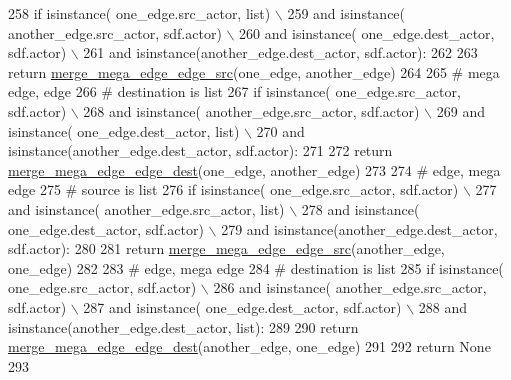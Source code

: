 \begin{DoxyCode}
258       \textcolor{keywordflow}{if}  isinstance( one\_edge.src\_actor, list) \(\backslash\)
259               \textcolor{keywordflow}{and} isinstance( another\_edge.src\_actor, sdf.actor) \(\backslash\)
260               \textcolor{keywordflow}{and} isinstance( one\_edge.dest\_actor, sdf.actor) \(\backslash\)
261               \textcolor{keywordflow}{and} isinstance(another\_edge.dest\_actor, sdf.actor):
262 
263         \textcolor{keywordflow}{return} \hyperlink{namespacesylva_1_1glic_1_1glic_adaac876d9630352fd0f5e4e3350d5b30}{merge\_mega\_edge\_edge\_src}(one\_edge, another\_edge)
264 
265       \textcolor{comment}{# mega edge, edge}
266       \textcolor{comment}{# destination is list}
267       \textcolor{keywordflow}{if}  isinstance( one\_edge.src\_actor, sdf.actor) \(\backslash\)
268               \textcolor{keywordflow}{and} isinstance( another\_edge.src\_actor, sdf.actor) \(\backslash\)
269               \textcolor{keywordflow}{and} isinstance( one\_edge.dest\_actor, list) \(\backslash\)
270               \textcolor{keywordflow}{and} isinstance(another\_edge.dest\_actor, sdf.actor):
271 
272         \textcolor{keywordflow}{return} \hyperlink{namespacesylva_1_1glic_1_1glic_aaa193270639d512daa1cf9fc2f952fdb}{merge\_mega\_edge\_edge\_dest}(one\_edge, another\_edge)
273 
274       \textcolor{comment}{# edge, mega edge}
275       \textcolor{comment}{# source is list}
276       \textcolor{keywordflow}{if}  isinstance( one\_edge.src\_actor, sdf.actor) \(\backslash\)
277               \textcolor{keywordflow}{and} isinstance( another\_edge.src\_actor, list) \(\backslash\)
278               \textcolor{keywordflow}{and} isinstance( one\_edge.dest\_actor, sdf.actor) \(\backslash\)
279               \textcolor{keywordflow}{and} isinstance(another\_edge.dest\_actor, sdf.actor):
280 
281         \textcolor{keywordflow}{return} \hyperlink{namespacesylva_1_1glic_1_1glic_adaac876d9630352fd0f5e4e3350d5b30}{merge\_mega\_edge\_edge\_src}(another\_edge, one\_edge)
282 
283       \textcolor{comment}{# edge, mega edge}
284       \textcolor{comment}{# destination is list}
285       \textcolor{keywordflow}{if}  isinstance( one\_edge.src\_actor, sdf.actor) \(\backslash\)
286               \textcolor{keywordflow}{and} isinstance( another\_edge.src\_actor, sdf.actor) \(\backslash\)
287               \textcolor{keywordflow}{and} isinstance( one\_edge.dest\_actor, sdf.actor) \(\backslash\)
288               \textcolor{keywordflow}{and} isinstance(another\_edge.dest\_actor, list):
289 
290         \textcolor{keywordflow}{return} \hyperlink{namespacesylva_1_1glic_1_1glic_aaa193270639d512daa1cf9fc2f952fdb}{merge\_mega\_edge\_edge\_dest}(another\_edge, one\_edge)
291 
292     \textcolor{keywordflow}{return} \textcolor{keywordtype}{None}
293 
\end{DoxyCode}
\mbox{\label{namespacesylva_1_1glic_1_1glic_af9c053311339f7220d8a605b492126c0}} 

